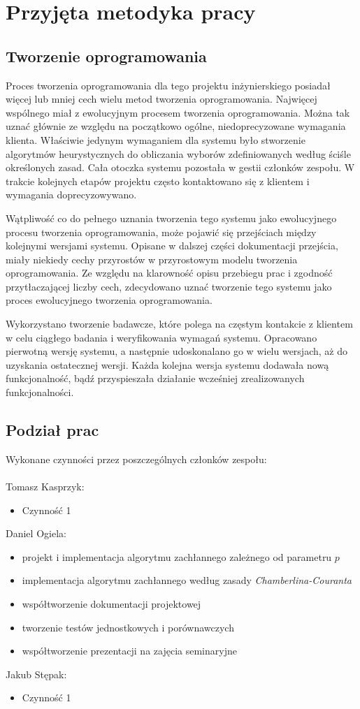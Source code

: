 \documentclass[pdflatex,11pt]{../aghdoc_version2}
\newlength\tindent
\renewcommand{\indent}{\hspace*{\tindent}}
\begin{document}
\chapter{Przyjęta metodyka pracy}
\section{Tworzenie oprogramowania}
Proces tworzenia oprogramowania dla tego projektu inżynierskiego posiadał więcej lub mniej
cech wielu metod tworzenia oprogramowania. Najwięcej wspólnego miał z ewolucyjnym
procesem tworzenia oprogramowania. Można tak uznać głównie ze względu na początkowo
ogólne, niedoprecyzowane wymagania klienta. Właściwie jedynym wymaganiem dla
systemu było stworzenie algorytmów heurystycznych do obliczania wyborów zdefiniowanych
według ściśle określonych zasad. Cała otoczka systemu pozostała w gestii członków
zespołu. W trakcie kolejnych etapów projektu często kontaktowano się z klientem i
wymagania doprecyzowywano. 

\indent Wątpliwość co do pełnego uznania tworzenia tego systemu
jako ewolucyjnego procesu tworzenia oprogramowania, może pojawić się przejściach
między kolejnymi wersjami systemu. Opisane w dalszej części dokumentacji przejścia, miały niekiedy cechy przyrostów w przyrostowym modelu tworzenia oprogramowania. Ze względu na klarowność opisu przebiegu prac i zgodność przytłaczającej liczby cech, zdecydowano uznać tworzenie tego systemu jako proces
ewolucyjnego tworzenia oprogramowania.

\indent Wykorzystano tworzenie badawcze, które polega na częstym kontakcie z klientem w celu
ciągłego badania i weryfikowania wymagań systemu. Opracowano pierwotną wersję
systemu, a następnie udoskonalano go w wielu wersjach, aż do uzyskania ostatecznej
wersji. Każda kolejna wersja systemu dodawała nową funkcjonalność, bądź przyspieszała
działanie wcześniej zrealizowanych funkcjonalności.

\section{Podział prac}
Wykonane czynności przez poszczególnych członków zespołu: \\ \\
Tomasz Kasprzyk:
\begin{itemize}
\item Czynność 1
\end{itemize}
Daniel Ogiela:
\begin{itemize}
\item projekt i implementacja algorytmu zachłannego zależnego od parametru $p$
\item implementacja algorytmu zachłannego według zasady \textit{Chamberlina-Couranta}
\item współtworzenie dokumentacji projektowej
\item tworzenie testów jednostkowych i porównawczych
\item współtworzenie prezentacji na zajęcia seminaryjne
\end{itemize}
Jakub Stępak:
\begin{itemize}
\item Czynność 1
\end{itemize}
\end{document}
